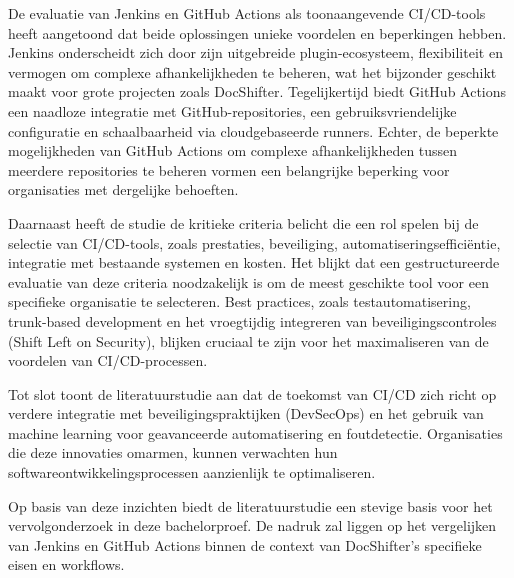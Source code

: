 De evaluatie van Jenkins en GitHub Actions als toonaangevende CI/CD-tools heeft aangetoond dat beide oplossingen unieke voordelen en beperkingen hebben. Jenkins onderscheidt zich door zijn uitgebreide plugin-ecosysteem, flexibiliteit en vermogen om complexe afhankelijkheden te beheren, wat het bijzonder geschikt maakt voor grote projecten zoals DocShifter. Tegelijkertijd biedt GitHub Actions een naadloze integratie met GitHub-repositories, een gebruiksvriendelijke configuratie en schaalbaarheid via cloudgebaseerde runners. Echter, de beperkte mogelijkheden van GitHub Actions om complexe afhankelijkheden tussen meerdere repositories te beheren vormen een belangrijke beperking voor organisaties met dergelijke behoeften.

Daarnaast heeft de studie de kritieke criteria belicht die een rol spelen bij de selectie van CI/CD-tools, zoals prestaties, beveiliging, automatiseringsefficiëntie, integratie met bestaande systemen en kosten. Het blijkt dat een gestructureerde evaluatie van deze criteria noodzakelijk is om de meest geschikte tool voor een specifieke organisatie te selecteren. Best practices, zoals testautomatisering, trunk-based development en het vroegtijdig integreren van beveiligingscontroles (Shift Left on Security), blijken cruciaal te zijn voor het maximaliseren van de voordelen van CI/CD-processen.

Tot slot toont de literatuurstudie aan dat de toekomst van CI/CD zich richt op verdere integratie met beveiligingspraktijken (DevSecOps) en het gebruik van machine learning voor geavanceerde automatisering en foutdetectie. Organisaties die deze innovaties omarmen, kunnen verwachten hun softwareontwikkelingsprocessen aanzienlijk te optimaliseren.

Op basis van deze inzichten biedt de literatuurstudie een stevige basis voor het vervolgonderzoek in deze bachelorproef. De nadruk zal liggen op het vergelijken van Jenkins en GitHub Actions binnen de context van DocShifter's specifieke eisen en workflows.


